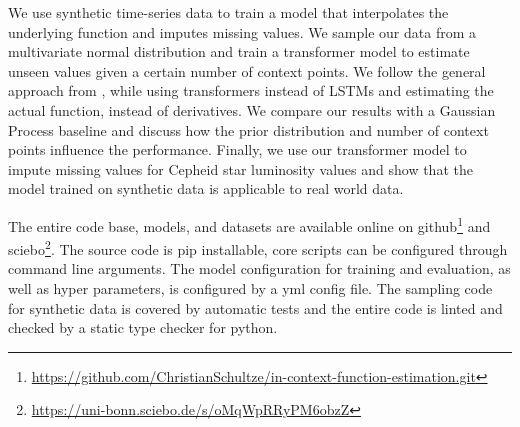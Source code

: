 We use synthetic time-series data to train a model that interpolates the underlying function and imputes missing values. We sample our data from a multivariate normal distribution and train a transformer model to estimate unseen values given a certain number of context points. We follow the general approach from \citet{seifner2025zeroshotimputationfoundationinference}, while using transformers instead of LSTMs and estimating the actual function, instead of derivatives. We compare our results with a Gaussian Process baseline and discuss how the prior distribution and number of context points influence the performance. Finally, we use our transformer model to impute missing values for Cepheid star luminosity values and show that the model trained on synthetic data is applicable to real world data.

The entire code base, models, and datasets are available online on github\footnote{\url{https://github.com/ChristianSchultze/in-context-function-estimation.git}} and sciebo\footnote{\url{https://uni-bonn.sciebo.de/s/oMqWpRRyPM6obzZ}}.
The source code is pip installable, core scripts can be configured through command line arguments. The model configuration for training and evaluation, as well as hyper parameters, is configured by a yml config file. The sampling code for synthetic data is covered by automatic tests and the entire code is linted and checked by a static type checker for python.